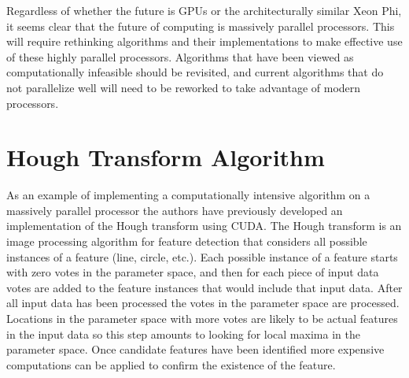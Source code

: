 \documentclass{JINST}
\begin{document}
Regardless of whether the future is GPUs or the architecturally similar Xeon Phi, it seems clear that the future of computing is massively parallel processors.  This will require rethinking algorithms and their implementations to make effective use of these highly parallel processors.  Algorithms that have been viewed as computationally infeasible should be revisited, and current algorithms that do not parallelize well will need to be reworked to take advantage of modern processors.

\section{Hough Transform Algorithm}

As an example of implementing a computationally intensive algorithm on a massively parallel processor the authors have previously developed an implementation of the Hough transform using CUDA.  The Hough transform is an image processing algorithm for feature detection that considers all possible instances of a feature (line, circle, etc.).  Each possible instance of a feature starts with zero votes in the parameter space, and then for each piece of input data votes are added to the feature instances that would include that input data.  After all input data has been processed the votes in the parameter space are processed.  Locations in the parameter space with more votes are likely to be actual features in the input data so this step amounts to looking for local maxima in the parameter space.  Once candidate features have been identified more expensive computations can be applied to confirm the existence of the feature.
\end{document}
